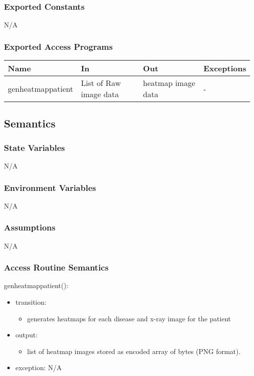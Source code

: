 \documentclass[12pt, titlepage]{article}
\begin{document}
\subsubsection{Exported Constants}
N/A
\subsubsection{Exported Access Programs}

\begin{center}
\begin{tabular}{p{3cm} p{4cm} p{4cm} p{5cm}}
\hline
\textbf{Name} & \textbf{In} & \textbf{Out} & \textbf{Exceptions} \\
\hline
genheatmappatient & List of Raw image data & heatmap image data & - \\
\hline
\end{tabular}
\end{center}

\subsection{Semantics}

\subsubsection{State Variables}
N/A
\subsubsection{Environment Variables}
N/A
\subsubsection{Assumptions}
N/A
\subsubsection{Access Routine Semantics}

\noindent genheatmappatient():
\begin{itemize}
\item transition: \begin{itemize}
    \item generates heatmaps for each disease and x-ray image for the patient
\end{itemize}
\item output: \begin{itemize}
    \item list of heatmap images stored as encoded array of bytes (PNG format).
\end{itemize}
\item exception: N/A
\end{itemize}
\end{document}
